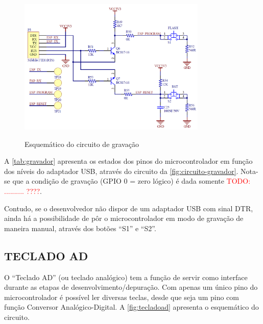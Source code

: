 \begin{figure}[H]
    \centering
    \caption{Esquemático do circuito de gravação}
    \includegraphics[width=0.8\textwidth]{./dados/figuras/gravacao}
    \label{fig:circuito-gravador}
\end{figure}

A \autoref{tab:gravador} apresenta os estados dos pinos do microcontrolador em função dos níveis do adaptador USB, através do circuito da \autoref{fig:circuito-gravador}. Nota-se que a condição de gravação (GPIO 0 = zero lógico) é dada somente \textcolor{red}{TODO: .......... ????}.



Contudo, se o desenvolvedor não dispor de um adaptador USB com sinal DTR, ainda há a possibilidade de pôr o microcontrolador em modo de gravação de maneira manual, através dos botões ``S1'' e ``S2''.

\subsection{TECLADO AD}
\label{subsec:tecladoad}

O ``Teclado AD'' (ou teclado analógico) tem a função de servir como interface durante as etapas de desenvolvimento/depuração. Com apenas um único pino do microcontrolador é possível ler diversas teclas, desde que seja um pino com função Conversor Analógico-Digital. A \autoref{fig:tecladoad} apresenta o esquemático do circuito.

